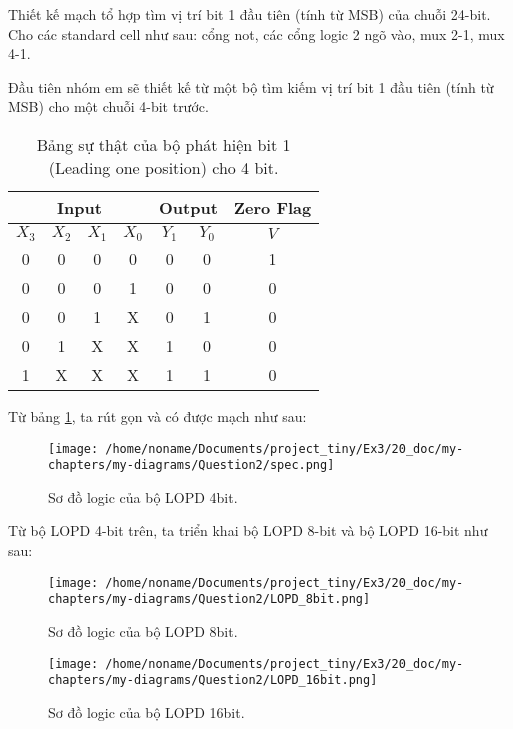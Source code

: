 
Thiết kế mạch tổ hợp tìm vị trí bit 1 đầu tiên (tính từ MSB) của chuỗi 24-bit. Cho các standard cell như sau: cổng not, các cổng logic 2 ngõ vào, mux 2-1, mux 4-1.


Đầu tiên nhóm em sẽ thiết kế từ một bộ tìm kiếm vị trí bit 1 đầu tiên (tính từ MSB) cho một chuỗi 4-bit trước. 

\begin{table}[H]
	\centering
	\begin{tabular}{|c|c|c|c|c|c|c|}
		\hline
		\multicolumn{4}{|c|}{Input} & \multicolumn{2}{c|}{Output} & Zero Flag \\
		\hline
		$X_{3}$ & $X_{2}$ & $X_{1}$ & $X_{0}$ & $Y_{1}$ & $Y_{0}$ & $V$ \\
		\hline
		0 & 0 & 0 & 0 & 0 & 0 & 1 \\
		\hline
		0 & 0 & 0 & 1 & 0 & 0 & 0 \\
		\hline
		0 & 0 & 1 & X & 0 & 1 & 0 \\
		\hline
		0 & 1 & X & X & 1 & 0 & 0 \\
		\hline
		1 & X & X & X & 1 & 1 & 0 \\
		\hline
	\end{tabular}
	\caption{Bảng sự thật của bộ phát hiện bit 1 (Leading one position) cho 4 bit.}
	\label{tab:leading-one-4bit}
\end{table}

Từ bảng \ref{tab:leading-one-4bit}, ta rút gọn và có được mạch như sau:

\begin{figure}[H]
	\centering
	\texttt{[image: /home/noname/Documents/project\_tiny/Ex3/20\_doc/my-chapters/my-diagrams/Question2/spec.png]}
	\caption{Sơ đồ logic của bộ LOPD 4bit.}
\end{figure}

Từ bộ LOPD 4-bit trên, ta triển khai bộ LOPD 8-bit và bộ LOPD 16-bit như sau:

\begin{figure}[H]
	\centering
	\texttt{[image: /home/noname/Documents/project\_tiny/Ex3/20\_doc/my-chapters/my-diagrams/Question2/LOPD\_8bit.png]}
	\caption{Sơ đồ logic của bộ LOPD 8bit.}
\end{figure}

\begin{figure}[H]
	\centering
	\texttt{[image: /home/noname/Documents/project\_tiny/Ex3/20\_doc/my-chapters/my-diagrams/Question2/LOPD\_16bit.png]}
	\caption{Sơ đồ logic của bộ LOPD 16bit.}
\end{figure}

